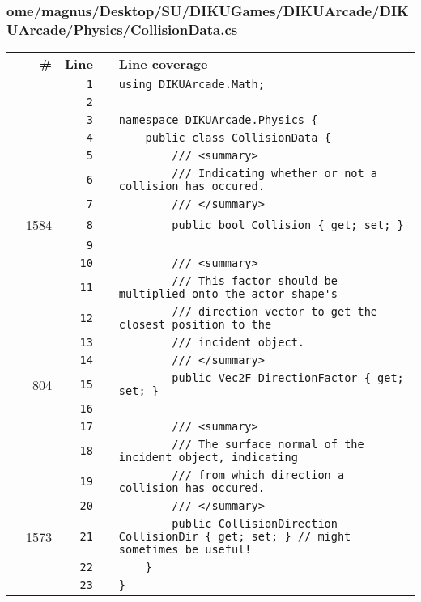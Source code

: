 \documentclass[a4paper,landscape,10pt]{article}
\begin{document}
\subsubsection{ome/magnus/Desktop/SU/DIKUGames/DIKUArcade/DIKUArcade/Physics/CollisionData.cs}
\begin{longtable}[l]{lrrll}
\textbf{} & \textbf{\#} & \textbf{Line} & \textbf{} & \textbf{Line coverage}\\
\cellcolor{gray} &  & \verb~1~ & & \verb~using DIKUArcade.Math;~\\
\cellcolor{gray} &  & \verb~2~ & & \verb~~\\
\cellcolor{gray} &  & \verb~3~ & & \verb~namespace DIKUArcade.Physics {~\\
\cellcolor{gray} &  & \verb~4~ & & \verb~    public class CollisionData {~\\
\cellcolor{gray} &  & \verb~5~ & & \verb~        /// <summary>~\\
\cellcolor{gray} &  & \verb~6~ & & \verb~        /// Indicating whether or not a collision has occured.~\\
\cellcolor{gray} &  & \verb~7~ & & \verb~        /// </summary>~\\
\cellcolor{green} & 1584 & \verb~8~ & & \verb~        public bool Collision { get; set; }~\\
\cellcolor{gray} &  & \verb~9~ & & \verb~~\\
\cellcolor{gray} &  & \verb~10~ & & \verb~        /// <summary>~\\
\cellcolor{gray} &  & \verb~11~ & & \verb~        /// This factor should be multiplied onto the actor shape's~\\
\cellcolor{gray} &  & \verb~12~ & & \verb~        /// direction vector to get the closest position to the~\\
\cellcolor{gray} &  & \verb~13~ & & \verb~        /// incident object.~\\
\cellcolor{gray} &  & \verb~14~ & & \verb~        /// </summary>~\\
\cellcolor{green} & 804 & \verb~15~ & & \verb~        public Vec2F DirectionFactor { get; set; }~\\
\cellcolor{gray} &  & \verb~16~ & & \verb~~\\
\cellcolor{gray} &  & \verb~17~ & & \verb~        /// <summary>~\\
\cellcolor{gray} &  & \verb~18~ & & \verb~        /// The surface normal of the incident object, indicating~\\
\cellcolor{gray} &  & \verb~19~ & & \verb~        /// from which direction a collision has occured.~\\
\cellcolor{gray} &  & \verb~20~ & & \verb~        /// </summary>~\\
\cellcolor{green} & 1573 & \verb~21~ & & \verb~        public CollisionDirection CollisionDir { get; set; } // might sometimes be useful!~\\
\cellcolor{gray} &  & \verb~22~ & & \verb~    }~\\
\cellcolor{gray} &  & \verb~23~ & & \verb~}~\\
\end{longtable}
\newpage
\end{document}

